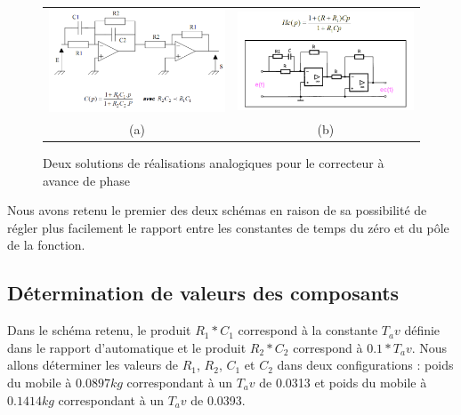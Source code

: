 \documentclass[11pt, french]{article} %
\begin{document}
\begin{figure}[!h]
    \centering
    \begin{tabular}{cc}
      \includegraphics[width=8cm]{SolutionAnalogique/Avph.png} &
      \includegraphics[width=8cm]{SolutionAnalogique/Avph2.png} \\

      (a) & (b)\\
    \end{tabular}
    \caption{Deux solutions de réalisations analogiques pour le correcteur à avance de phase
    \label{avph_sol_poss}}
\end{figure}

Nous avons retenu le premier des deux schémas en raison de sa possibilité de régler plus facilement le rapport entre les constantes de temps du zéro et du pôle de la fonction. 

\subsection{Détermination de valeurs des composants}

Dans le schéma retenu, le produit $R_1*C_1$ correspond à la constante $ T_av$ définie dans le rapport d'automatique et le produit $R_2*C_2$ correspond à $0.1*T_av$. Nous allons déterminer les valeurs de $R_1$, $R_2$, $C_1$ et $C_2$ dans deux configurations : poids du mobile à $0.0897 kg$ correspondant à un $T_av$ de 0.0313 et poids du mobile à $0.1414 kg$ correspondant à un $T_av$ de 0.0393.
\end{document}
